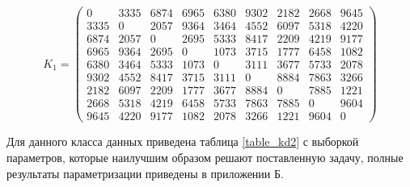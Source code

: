 \begin{equation}
	K_{1} = \begin{pmatrix}
		0 & 3335 & 6874 & 6965 & 6380 & 9302 & 2182 & 2668 & 9645\\
		3335 & 0 & 2057 & 9364 & 3464 & 4552 & 6097 & 5318 & 4220\\
		6874 & 2057 & 0 & 2695 & 5333 & 8417 & 2209 & 4219 & 9177\\ 
		6965 & 9364 & 2695 & 0 & 1073 & 3715 & 1777 & 6458 & 1082\\
		6380 & 3464 & 5333 & 1073 & 0 & 3111 & 3677 & 5733 & 2078\\
		9302 & 4552 & 8417 & 3715 & 3111 & 0 & 8884 & 7863 & 3266\\
		2182 & 6097 & 2209 & 1777 & 3677 & 8884 & 0 & 7885 & 1221\\ 
		2668 & 5318 & 4219 & 6458 & 5733 & 7863 & 7885 & 0 & 9604\\ 
		9645 & 4220 & 9177 & 1082 & 2078 & 3266 & 1221 & 9604 & 0
	\end{pmatrix}
\end{equation}


Для данного класса данных приведена таблица \ref{table_kd2}	с выборкой параметров, которые наилучшим образом решают поставленную задачу, полные результаты параметризации приведены в приложении Б.

